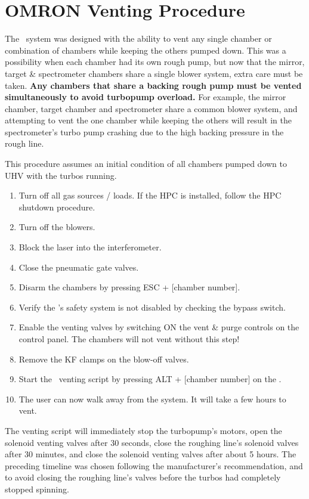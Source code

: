 \section{OMRON Venting Procedure}

The \OMRON \ system was designed with the ability to vent any single chamber or combination of chambers while keeping the others pumped down. This was a possibility when each chamber had its own rough pump, but now that the mirror, target \& spectrometer chambers share a single blower system, extra care must be taken. \textbf{Any chambers that share a backing rough pump must be vented simultaneously to avoid turbopump overload.} For example, the mirror chamber, target chamber and spectrometer share a common blower system, and attempting to vent the one chamber while keeping the others will result in the spectrometer's turbo pump crashing due to the high backing pressure in the rough line.

This procedure assumes an initial condition of all chambers pumped down to UHV with the turbos running.

\begin{enumerate}
	\item Turn off all gas sources / loads. If the HPC is installed, follow the HPC shutdown procedure.
	\item Turn off the blowers.
	\item Block the laser into the interferometer.
	\item Close the pneumatic gate valves.
	\item Disarm the chambers by pressing ESC + [chamber number].
	\item Verify the \OMRON's safety system is not disabled by checking the bypass switch.
	\item Enable the venting valves by switching ON the vent \& purge controls on the control panel. The chambers will not vent without this step!
	\item Remove the KF clamps on the blow-off valves.
	\item Start the \OMRON \ venting script by pressing ALT + [chamber number] on the \OMRON.
	\item The user can now walk away from the system. It will take a few hours to vent.
\end{enumerate}

The venting script will immediately stop the turbopump's motors, open the solenoid venting valves after 30 seconds, close the roughing line's solenoid valves after 30 minutes, and close the solenoid venting valves after about 5 hours. The preceding timeline was chosen following the manufacturer's recommendation, and to avoid closing the roughing line's valves before the turbos had completely stopped spinning. 

